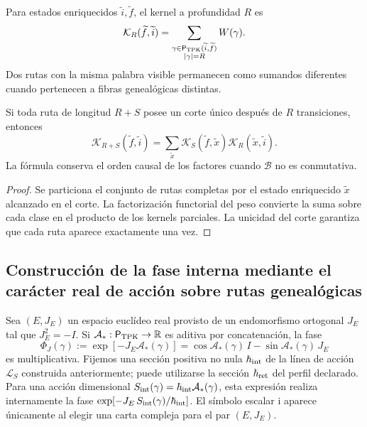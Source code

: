 Para estados enriquecidos \(\widetilde i,\widetilde f\), el kernel a
profundidad \(R\) es
\begin{equation}
 \mathcal K_R(\widetilde f,\widetilde i)
 =\sum_{\substack{
   \gamma\in\mathsf P_{\rm TPK}(\widetilde i,\widetilde f)\\
   |\gamma|=R}}
 W(\gamma).
 \label{eq:kernel-genealogico-finito-rev2}
\end{equation}
Dos rutas con la misma palabra visible permanecen como sumandos diferentes
cuando pertenecen a fibras genealógicas distintas.

\begin{proposition}
\label{prop:composicion-kernel-enriquecido-rev2}
Si toda ruta de longitud \(R+S\) posee un corte único después de \(R\)
transiciones, entonces
\[
 \mathcal K_{R+S}(\widetilde f,\widetilde i)
 =\sum_{\widetilde x}
 \mathcal K_S(\widetilde f,\widetilde x)
 \mathcal K_R(\widetilde x,\widetilde i).
\]
La fórmula conserva el orden causal de los factores cuando \(\mathcal B\) no
es conmutativa.
\end{proposition}

\begin{proof}
Se particiona el conjunto de rutas completas por el estado enriquecido
\(\widetilde x\) alcanzado en el corte. La factorización functorial del peso
convierte la suma sobre cada clase en el producto de los kernels parciales.
La unicidad del corte garantiza que cada ruta aparece exactamente una vez.
\end{proof}

\subsection{Construcción de la fase interna mediante el carácter real de acción sobre rutas genealógicas}

Sea \((E,J_E)\) un espacio euclídeo real provisto de un endomorfismo
ortogonal \(J_E\) tal que \(J_E^2=-I\). Si
\(\mathcal A_*:\mathsf P_{\rm TPK}\to\mathbb R\) es aditiva por
concatenación, la fase
\begin{equation}
 \Phi_J(\gamma)
 :=\exp[-J_E\mathcal A_*(\gamma)]
 =\cos\mathcal A_*(\gamma)\,I
  -\sin\mathcal A_*(\gamma)\,J_E
 \label{eq:fase-interna-caminos-rev2}
\end{equation}
es multiplicativa. Fijemos una sección positiva no nula
\(\hbar_{\rm int}\) de la línea de acción \(\mathcal L_S\)
construida anteriormente; puede utilizarse la sección
\(\hbar_{\rm ret}\) del perfil declarado.
Para una acción dimensional
\(S_{\rm int}(\gamma)=\hbar_{\rm int}\mathcal A_*(\gamma)\), esta
expresión realiza internamente la fase
\(\exp[-J_E\,S_{\rm int}(\gamma)/\hbar_{\rm int}]\). El símbolo escalar
\(\mathrm i\) aparece únicamente al elegir una carta compleja para el par
\((E,J_E)\).

